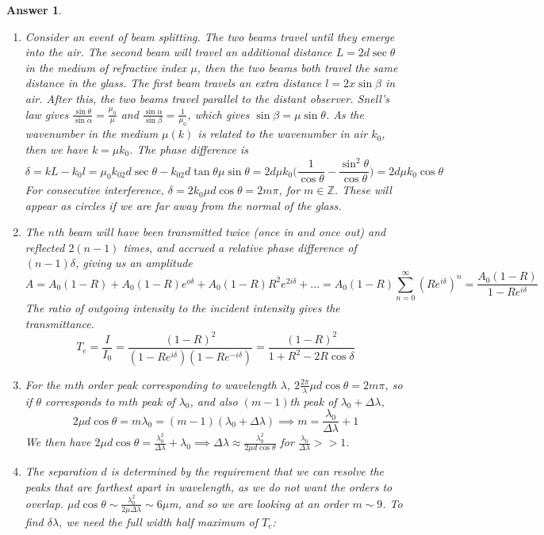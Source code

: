 \documentclass[a4paper]{article}
\newtheorem{ans}{Answer}[subsection]
\theoremstyle{new}
\begin{document}
\begin{ans}\leavevmode
\begin{enumerate}[label=(\roman*)]
\item Consider an event of beam splitting. The two beams travel until they emerge into the air. The second beam will travel an additional distance $L=2d\sec\theta$ in the medium of refractive index $\mu$, then the two beams both travel the same distance in the glass. The first beam travels an extra distance $l=2x\sin\beta$ in air. After this, the two beams travel parallel to the distant observer. Snell's law gives $\frac{\sin\theta}{\sin\alpha}=\frac{\mu_0}{\mu}$ and $\frac{\sin\alpha}{\sin\beta}=\frac{1}{\mu_0}$, which gives $\sin\beta=\mu\sin\theta$. As the wavenumber in the medium $\mu(k)$ is related to the wavenumber in air $k_0$, then we have $k=\mu k_0$. The phase difference is 
$$\delta =kL-k_0l=\mu_0k_02d\sec\theta-k_02d\tan\theta\mu\sin\theta=2d\mu k_0\bigg(\frac{1}{\cos\theta}-\frac{\sin^2\theta}{\cos\theta}\bigg)=2d\mu k_0\cos\theta$$
For consecutive interference, $\delta=2k_0\mu d\cos\theta=2m\pi$, for $m\in\mathbb{Z}$. These will appear as circles if we are far away from the normal of the glass.
\item The $n$th beam will have been transmitted twice (once in and once out) and reflected $2(n-1)$ times, and accrued a relative phase difference of $(n-1)\delta$, giving us an amplitude
$$A=A_0(1-R)+A_0(1-R)e^{o\delta}+A_0(1-R)R^2e^{2i\delta}+...=A_0(1-R)\sum_{n=0}^\infty (Re^{i\delta})^n=\frac{A_0(1-R)}{1-Re^{i\delta}}$$
The ratio of outgoing intensity to the incident intensity gives the transmittance.
$$T_e=\frac{I}{I_0}=\frac{(1-R)^2}{(1-Re^{i\delta})(1-Re^{-i\delta})}=\frac{(1-R)^2}{1+R^2-2R\cos\delta}$$
\item For the $m$th order peak corresponding to wavelength $\lambda$, $2\frac{2\pi}{\lambda}\mu d\cos\theta=2m\pi$, so if $\theta$ corresponds to $m$th peak of $\lambda_0$, and also $(m-1)$th peak of $\lambda_0+\Delta\lambda$, 
$$2\mu d\cos\theta=m\lambda_0=(m-1)(\lambda_0+\Delta\lambda)\implies m=\frac{\lambda_0}{\Delta\lambda}+1$$
We then have $2\mu d\cos\theta=\frac{\lambda_0^2}{\Delta\lambda}+\lambda_0\implies\Delta\lambda\approx\frac{\lambda_0^2}{2\mu d\cos\theta}$ for $\frac{\lambda_0}{\Delta\lambda}>>1$.
\item The separation $d$ is determined by the requirement that we can resolve the peaks that are farthest apart in wavelength, as we do not want the orders to overlap. $\mu d\cos\theta\sim\frac{\lambda_0^2}{2\mu\Delta\lambda}\sim 6\mu$m, and so we are looking at an order $m\sim 9$. To find $\delta\lambda$, we need the full width half maximum of $T_e$:

\end{enumerate}
\end{ans}
\end{document}
